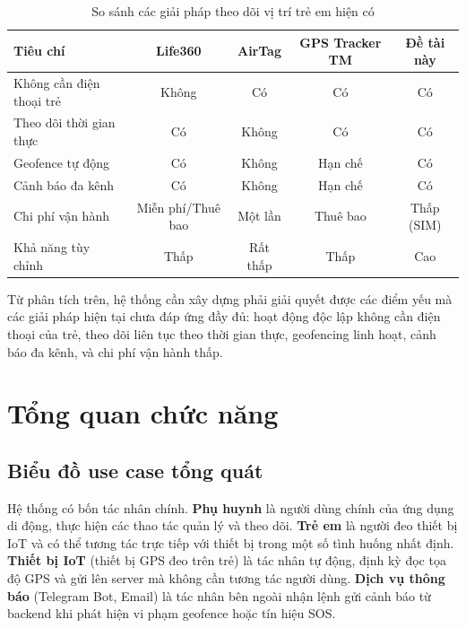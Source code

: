 \documentclass[../DoAn.tex]{subfiles}
\begin{document}
\begin{table}[H]
\centering
\caption{So sánh các giải pháp theo dõi vị trí trẻ em hiện có}
\label{table:comparison}
\begin{tabular}{|l|c|c|c|c|}
\hline
\textbf{Tiêu chí} & \textbf{Life360} & \textbf{AirTag} & \textbf{GPS Tracker TM} & \textbf{Đề tài này} \\
\hline
Không cần điện thoại trẻ    & Không & Có       & Có        & Có      \\
\hline
Theo dõi thời gian thực     & Có    & Không    & Có        & Có      \\
\hline
Geofence tự động            & Có    & Không    & Hạn chế   & Có      \\
\hline
Cảnh báo đa kênh            & Có    & Không    & Hạn chế   & Có      \\
\hline
Chi phí vận hành            & Miễn phí/Thuê bao & Một lần & Thuê bao & Thấp (SIM) \\
\hline
Khả năng tùy chỉnh          & Thấp  & Rất thấp & Thấp      & Cao     \\
\hline
\end{tabular}
\end{table}

Từ phân tích trên, hệ thống cần xây dựng phải giải quyết được các điểm yếu mà các giải pháp hiện tại chưa đáp ứng đầy đủ: hoạt động độc lập không cần điện thoại của trẻ, theo dõi liên tục theo thời gian thực, geofencing linh hoạt, cảnh báo đa kênh, và chi phí vận hành thấp.

\section{Tổng quan chức năng}
\label{section:2.2}

\subsection{Biểu đồ use case tổng quát}
\label{subsection:2.2.1}

Hệ thống có bốn tác nhân chính. \textbf{Phụ huynh} là người dùng chính của ứng dụng di động, thực hiện các thao tác quản lý và theo dõi. \textbf{Trẻ em} là người đeo thiết bị IoT và có thể tương tác trực tiếp với thiết bị trong một số tình huống nhất định. \textbf{Thiết bị IoT} (thiết bị GPS đeo trên trẻ) là tác nhân tự động, định kỳ đọc tọa độ GPS và gửi lên server mà không cần tương tác người dùng. \textbf{Dịch vụ thông báo} (Telegram Bot, Email) là tác nhân bên ngoài nhận lệnh gửi cảnh báo từ backend khi phát hiện vi phạm geofence hoặc tín hiệu SOS.
\end{document}
